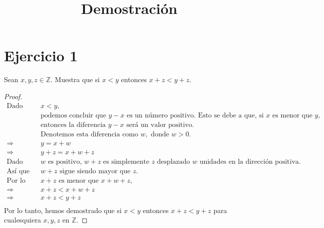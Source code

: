 \documentclass{article}
\begin{document}
\title{Demostración}
\maketitle

\section*{Ejercicio 1}

Sean \(x, y, z \in \mathbb{Z}\). Muestra que si \(x < y\) entonces \(x + z < y + z\).

\begin{proof}
\begin{align*}
\text{Dado que } & x < y, \\
& \text{podemos concluir que } y - x \text{ es un número positivo. Esto se debe a que, si } x \text{ es menor que } y, \\
& \text{entonces la diferencia } y - x \text{ será un valor positivo.} \\
& \text{Denotemos esta diferencia como } w, \text{ donde } w > 0. \\
\Rightarrow & y = x + w \\
\Rightarrow & y + z = x + w + z \\
\text{Dado que } & w \text{ es positivo, } w + z \text{ es simplemente } z \text{ desplazado } w \text{ unidades en la dirección positiva.} \\
\text{Así que } & w + z \text{ sigue siendo mayor que } z. \\
\text{Por lo tanto, } & x + z \text{ es menor que } x + w + z, \\
\Rightarrow & x + z < x + w + z \\
\Rightarrow & x + z < y + z \\
\end{align*}
Por lo tanto, hemos demostrado que si \(x < y\) entonces \(x + z < y + z\) para cualesquiera \(x, y, z\) en \(\mathbb{Z}\).
\end{proof}
\end{document}
